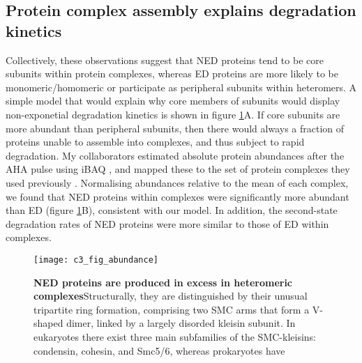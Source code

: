 \documentclass[a4paper,11pt,twoside,openright]{scrbook}
\begin{document}
\subsection{Protein complex assembly explains degradation kinetics}
Collectively, these observations suggest that NED proteins tend to be core subunits within protein complexes, whereas ED proteins are more likely to be monomeric/homomeric or participate as peripheral subunits within heteromers. A simple model that would explain why core members of subunits would display non-exponetial degradation kinetics is shown in figure \ref{figure:nedabundance}A. If core subunits are more abundant than peripheral subunits, then there would always a fraction of proteins unable to assemble into complexes, and thus subject to rapid degradation. My collaborators estimated absolute protein abundances after the AHA pulse using iBAQ \cite{Schwanhausser2011}, and mapped these to the set of protein complexes they used previously \cite{Ori2016}. Normalising abundances relative to the mean of each complex, we found that NED proteins within complexes were significantly more abundant than ED (figure \ref{figure:nedabundance}B), consistent with our model. In addition, the second-state degradation rates of NED proteins were more similar to those of ED within complexes.

\begin{figure}[h]
\fcapsideright
    {\caption[NED proteins are produced in excess in heteromeric complexes]{\sffamily\textbf{NED proteins are produced in excess in heteromeric complexes}\newline \small Structurally, they are distinguished by their unusual tripartite ring formation, comprising two SMC arms that form a V-shaped dimer, linked by a largely disorded kleisin subunit. In eukaryotes there exist three main subfamilies of the SMC-kleisins: condensin, cohesin, and Smc5/6, whereas prokaryotes have }\label{figure:nedabundance}}
    {\texttt{[image: c3\_fig\_abundance]}}
\end{figure}
\end{document}
